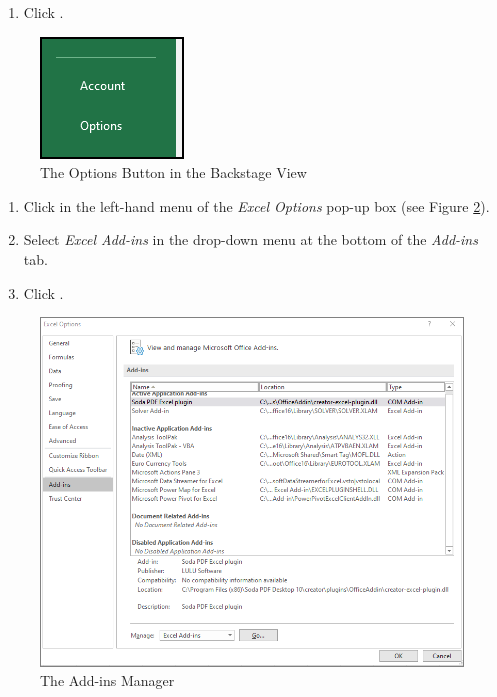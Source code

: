 \begin{enumerate}
	\item Click .
\end{enumerate}

\begin{figure}[H]
	\centering
	\includegraphics[width=\maxwidth{.50\linewidth}]{gfx/ch09_fig50}
	\caption{The Options Button in the Backstage View}
	\label{09:fig50}
\end{figure}

\begin{enumerate}[resume]	
	
	\item Click  in the left-hand menu of the \textit{Excel Options} pop-up box (see Figure \ref{09:fig51}).
	\item Select \textit{Excel Add-ins} in the drop-down menu at the bottom of the \textit{Add-ins} tab.
	\item Click .
	
\end{enumerate}

\begin{figure}[H]
	\centering
	\includegraphics[width=\maxwidth{.95\linewidth}]{gfx/ch09_fig51}
	\caption{The Add-ins Manager}
	\label{09:fig51}
\end{figure}

